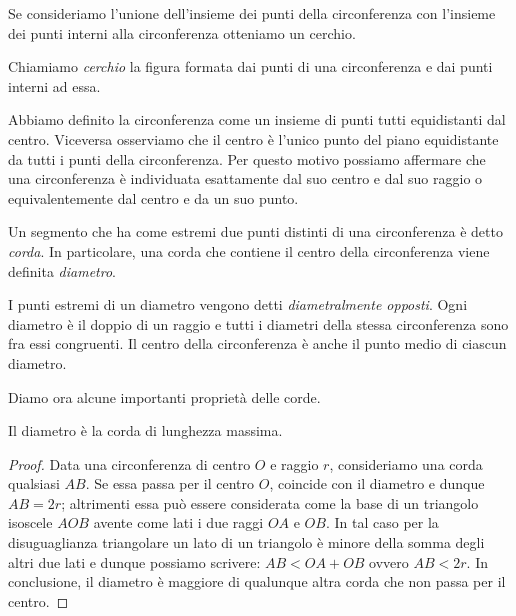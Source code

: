 Se consideriamo l'unione dell'insieme dei punti della circonferenza 
con l'insieme dei punti interni alla circonferenza otteniamo un 
cerchio.

\begin{definizione}
Chiamiamo \emph{cerchio} la figura formata dai punti di una 
circonferenza e dai punti interni ad essa.
\end{definizione}

Abbiamo definito la circonferenza come un insieme di punti tutti 
equidistanti dal centro. Viceversa osserviamo che il centro è l'unico 
punto del piano equidistante da tutti i punti della circonferenza. 
Per questo motivo possiamo affermare che una circonferenza è 
individuata esattamente dal suo centro e dal suo raggio o 
equivalentemente dal centro e da un suo punto.

\begin{definizione}
Un segmento che ha come estremi due punti distinti di una 
circonferenza è detto \emph{corda}. In particolare, una corda che 
contiene il centro della circonferenza viene definita \emph{diametro}.
\end{definizione}

I punti estremi di un diametro vengono detti \emph{diametralmente 
opposti}.
Ogni diametro è il doppio di un raggio e tutti i diametri della 
stessa circonferenza sono fra essi congruenti. Il centro della 
circonferenza è anche il punto medio di ciascun diametro.

Diamo ora alcune importanti proprietà delle corde.

\begin{teorema}
Il diametro è la corda di lunghezza massima.
\end{teorema}

\noindent\begin{minipage}{0.65\textwidth}\parindent15pt
\begin{proof}
Data una circonferenza di centro $O$ e raggio $r$, consideriamo una 
corda qualsiasi $AB$. Se essa passa per il centro $O$, coincide con 
il diametro e dunque $AB=2r$; altrimenti essa può essere considerata 
come la base di un triangolo isoscele $AOB$ avente come lati i due 
raggi $OA$ e $OB$. In tal caso per la disuguaglianza triangolare un 
lato di un triangolo è minore della somma degli altri due lati e 
dunque possiamo scrivere: $AB < OA + OB$ ovvero $AB < 2r$.
In conclusione, il diametro è maggiore di qualunque altra corda che 
non passa per il centro.
\end{proof}
\end{minipage}\hfil
\begin{minipage}{0.35\textwidth}
  \centering
\end{minipage}


